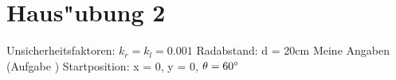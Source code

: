\documentclass[11pt]{article}
\begin{document}
\section{Haus"ubung 2}\label{sec:h2}
    Unsicherheitsfaktoren: $k_{r} = k_{l} = 0.001$\newline
    Radabstand: d = 20cm\newline
    Meine Angaben (Aufgabe )
    Startposition: x = 0, y = 0, $\theta = 60\degree$
\end{document}
